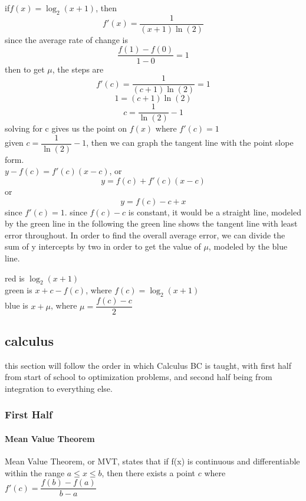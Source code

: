 \documentclass{article} %
\begin{document}
        \begin{center}
            if$f(x)=\log_2(x+1)$, then $$f'(x)=\dfrac{1}{(x+1)\ln(2)}$$since the average rate of change is $$\dfrac{f(1)-f(0)}{1-0}=1$$
            then to get $\mu$, the steps are $$f'(c)=\dfrac{1}{(c+1)\ln(2)}=1$$ $$1=(c+1)\ln(2)$$ $$c=\dfrac{1}{\ln(2)}-1$$
            solving for c gives us the point on $f(x)$ where $f'(c)=1$
            \\given $c=\dfrac{1}{\ln(2)}-1$, then we can graph the tangent line with the point slope form.\\ $y-f(c)=f'(c)(x-c)$, or
            $$y=f(c)+f'(c)(x-c)$$ or $$y=f(c)-c+x$$ since $f'(c)=1$. since $f(c)-c$ is constant, it would be a straight line, modeled by the green line in the following
            the green line shows the tangent line with least error throughout. In order to find the overall average error, we can divide the sum of y intercepts by two in order to get the value of $\mu$, modeled by the blue line.
            red is $\log_2(x+1)$\\
            green is $x+c-f(c)$, where $f(c)=\log_2(x+1)$\\
            blue is $x+\mu$, where $\mu=\dfrac{f(c)-c}{2}$
        \end{center}
            \subsection{calculus}
            this section will follow the order in which Calculus BC is taught, with first half from start of school to optimization problems, and second half being from integration to everything else.
                \subsubsection{First Half}
                    \paragraph{Mean Value Theorem} %
                    \label{ssub:Mean Value Theorem}
                            Mean Value Theorem, or MVT, states that if f(x) is continuous and differentiable within the range $a\le x \le b$, then there exists a point $c$ where $f'(c) = \dfrac{f(b)-f(a)}{b-a}$
\end{document}
